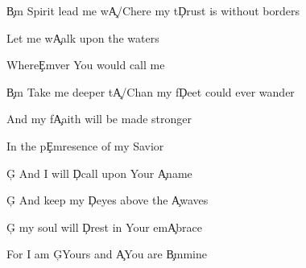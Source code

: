 \documentclass[9pt]{extarticle}
\begin{document}
\bb[2]
\c{Bm} Spirit lead me w\c{A/C\s }here my t\c{D}rust is without borders

Let me w\c{A}alk upon the waters

Where\c{Em}ver You would call me

\c{Bm} Take me deeper t\c{A/C\s }han my f\c{D}eet could ever wander

And my f\c{A}aith will be made stronger

In the p\c{Em}resence of my Savior
\eb

\bo
\c{G} And I will \c{D}call upon Your \c{A}name

\c{G} And keep my \c{D}eyes above the \c{A}waves

\c{G} my soul will \c{D}rest in Your em\c{A}brace

For I am \c{G}Yours and \c{A}You are \c{Bm}mine
\eo


\esong
\end{document}
